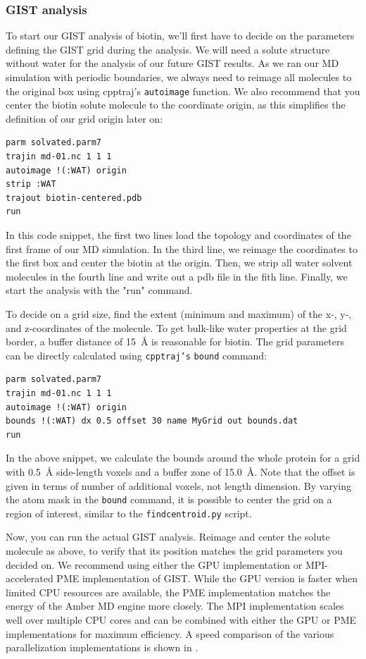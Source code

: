 \documentclass[9pt,tutorial]{livecoms}
\newcommand{\software}{\texttt}
\newcommand\inlinecode{\texttt}
\begin{document}
\subsubsection{GIST analysis}

To start our GIST analysis of biotin, we'll first have to decide on the parameters defining the GIST grid during the analysis.
We will need a solute structure without water for the analysis of our future GIST results. 
As we ran our MD simulation with periodic boundaries, we always need to reimage all molecules to the original box using cpptraj's \inlinecode{autoimage} function. 
We also recommend that you center the biotin solute molecule to the coordinate origin, as this simplifies the definition of our grid origin later on:

\begin{lstlisting}[style=cpptraj]
parm solvated.parm7 
trajin md-01.nc 1 1 1 
autoimage !(:WAT) origin 
strip :WAT 
trajout biotin-centered.pdb 
run
\end{lstlisting}
In this code snippet, the first two lines load the topology and coordinates of the first frame of our MD simulation. 
In the third line, we reimage the coordinates to the first box and center the biotin at the origin. 
Then, we strip all water solvent molecules in the fourth line and write out a pdb file in the fith line. 
Finally, we start the analysis with the "run" command.

To decide on a grid size, find the extent (minimum and maximum) of the x-, \mbox{y-,} and z-coordinates of the molecule.
To get bulk-like water properties at the grid border, a buffer distance of \SI{15}{\angstrom} is reasonable for biotin.
The grid parameters can be directly calculated using \software{cpptraj's} \inlinecode{bound} command:
\begin{lstlisting}[style=cpptraj]
parm solvated.parm7
trajin md-01.nc 1 1 1
autoimage !(:WAT) origin
bounds !(:WAT) dx 0.5 offset 30 name MyGrid out bounds.dat
run
\end{lstlisting}
In the above snippet, we calculate the bounds around the whole protein for a grid with \SI{0.5}{\angstrom} side-length voxels and a buffer zone of \SI{15.0}{\angstrom}. 
Note that the offset is given in terms of number of additional voxels, not length dimension. By varying the atom mask in the \inlinecode{bound} command, it is possible to center the grid on a region of interest, similar to the \software{findcentroid.py} script.

Now, you can run the actual GIST analysis.
Reimage and center the solute molecule as above, to verify that its position matches the grid parameters you decided on.
We recommend using either the GPU implementation or MPI-accelerated PME implementation of GIST.
While the GPU version is faster when limited CPU resources are available, the PME implementation matches the energy of the Amber MD engine more closely.
The MPI implementation \cite{Roe2023-mpi-gist} scales well over multiple CPU cores and can be combined with either the GPU or PME implementations for maximum efficiency. 
A speed comparison of the various parallelization implementations is shown in \cite{Roe2023-mpi-gist}.
\end{document}
